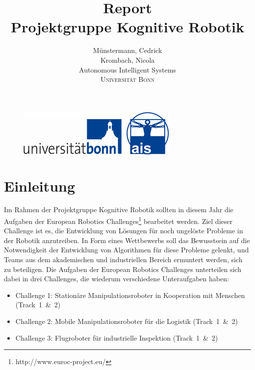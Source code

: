 \documentclass[12pt,titlepage, a4paper]{article}
\begin{document}
\begin{figure}
 \centering
 \includegraphics[width=298px,keepaspectratio=true]{./Screens/logo_uni_bonn_ais.png}
\end{figure}


\title{Report\vspace{5mm}\\\textbf{Projektgruppe Kognitive Robotik}\vspace{1cm}}


\author{Münstermann,  Cedrick\\  Krombach, Nicola\\[1cm]
	Autonomous Intelligent Systems\\ \textsc{Universität Bonn}\\}



\maketitle



\section{Einleitung}

Im Rahmen der Projektgruppe Kognitive Robotik sollten in diesem Jahr die Aufgaben der European Robotics Challenges\footnote{http://www.euroc-project.eu/} bearbeitet werden.
Ziel dieser Challenge ist es, die Entwicklung von Lösungen für noch ungelöste Probleme in der Robotik anzutreiben.
In Form eines Wettbewerbs soll das Bewusstsein auf die Notwendigkeit der Entwicklung von Algorithmen für diese Probleme gelenkt, und Teams aus dem 
akademischen und industriellen Bereich ermuntert werden, sich zu beteiligen.
Die Aufgaben der European Robotics Challenges unterteilen sich dabei in drei Challenges, die wiederum verschiedene Unteraufgaben haben:

\begin{itemize}
 \item Challenge 1: Stationäre Manipulationsroboter in Kooperation mit Menschen \mbox{(Track 1 \& 2)}
 \item Challenge 2: Mobile Manipulationsroboter für die Logistik \mbox{(Track 1 \& 2)}
 \item Challenge 3: Flugroboter für industrielle Inspektion \mbox{(Track 1 \& 2)}
\end{itemize}
\end{document}
